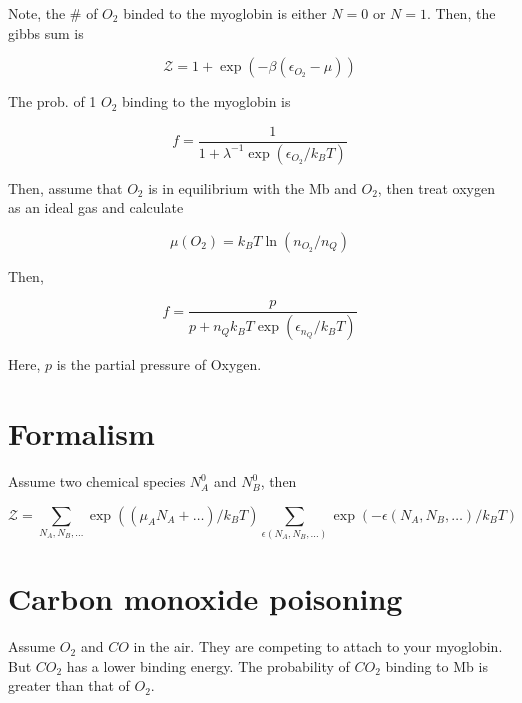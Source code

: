 \documentclass{article}
\newtheorem{one minute paper}[theorem]{One Minute Paper}
\begin{document}
Note, the \# of $O_2$ binded to the myoglobin is either $N=0$ or $N=1$. Then, the gibbs sum is 

\begin{equation}
    \mathcal{Z} = 1 + \exp(-\beta(\epsilon_{O_2} - \mu))
\end{equation}

The prob. of 1 $O_2$ binding to the myoglobin is 

\begin{equation}
    f = \frac{1}{1 + \lambda^{-1}\exp(\epsilon_{O_2}/k_B T)}
\end{equation}

Then, assume that $O_2$ is in equilibrium with the Mb and $O_2$, then treat oxygen as an ideal gas and calculate 

\begin{equation}
    \mu(O_2) = k_B T \ln\left( n_{O_2}/n_Q \right)
\end{equation}

Then, 

\begin{equation}
    f = \frac{p}{p + n_Q k_B T \exp(\epsilon_{n_Q}/k_B T)}
\end{equation}

Here, $p$ is the partial pressure of Oxygen. 

\section*{Formalism}

Assume two chemical species $N^0_A$ and $N^0_B$, then 

\begin{equation}
    \mathcal{Z} = \sum_{N_A, N_B, \dots}\exp((\mu_A N_A + \dots)/k_B T)\sum_{\epsilon(N_A, N_B,\dots)}\exp(-\epsilon(N_A,N_B,\dots)/k_B T)
\end{equation}

\section*{Carbon monoxide poisoning}

Assume $O_2$ and $CO$ in the air. They are competing to attach to your myoglobin. But $CO_2$ has a lower binding energy. The probability of $CO_2$ binding to Mb is greater than that of $O_2$. 
\end{document}
